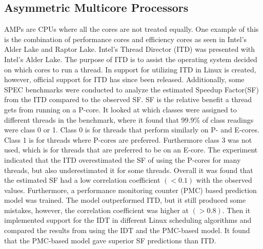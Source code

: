 \subsection{Asymmetric Multicore Processors}
AMPs are CPUs where all the cores are not treated equally. One example of this is the combination of performance cores and efficiency cores as seen in Intel's Alder Lake and Raptor Lake. Intel's Thread Director (ITD) was presented with Intel's Alder Lake. The purpose of ITD is to assist the operating system decided on which cores to run a thread.
In \cite{saez2022evaluation} support for utilizing ITD in Linux is created, however, official support for ITD has since been released. Additionally, some SPEC benchmarks were conducted to analyze the estimated Speedup Factor(SF) from the ITD compared to the observed SF. SF is the relative benefit a thread gets from running on a P-core. It looked at which classes were assigned to different threads in the benchmark, where it found that 99.9\% of class readings were class 0 or 1. Class 0 is for threads that perform similarly on P- and E-cores. Class 1 is for threads where P-cores are preferred.\cite{Intel202?whitepaper} Furthermore class 3 was not used, which is for threads that are preferred to be on an E-core. The experiment indicated that the ITD overestimated the SF of using the P-cores for many threads, but also underestimated it for some threads. Overall it was found that the estimated SF had a low correlation coefficient $(<0.1)$ with the observed values. Furthermore, a performance monitoring counter (PMC) based prediction model was trained. The model outperformed ITD, but it still produced some mistakes, however, the correlation coefficient was higher at $(>0.8)$. Then it implemented support for the IDT in different Linux scheduling algorithms and compared the results from using the IDT and the PMC-based model. It found that the PMC-based model gave superior SF predictions than ITD.\cite{saez2022evaluation}